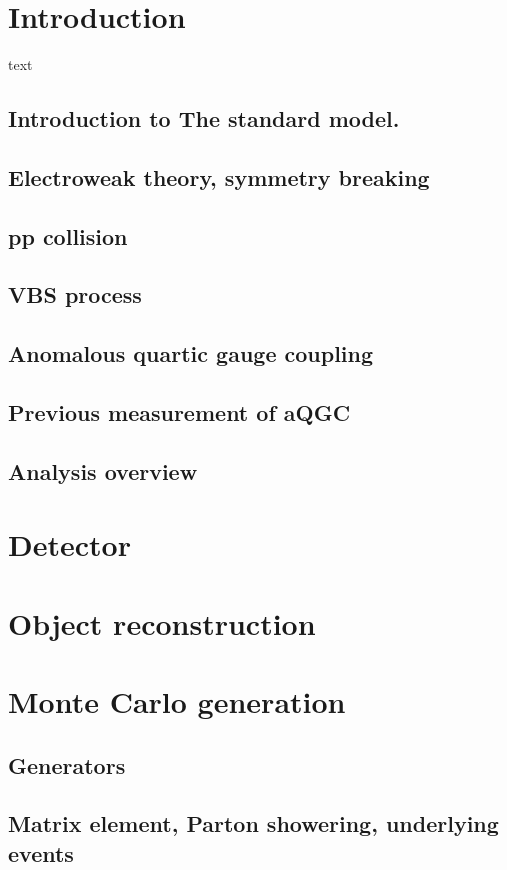 \documentclass[12pt]{article}
\begin{document}
\newpage 
\begin{doublespacing}
\section{Introduction}
text
\subsection{Introduction to The standard model.}
\subsection{Electroweak theory, symmetry breaking}
\subsection{pp collision}
\subsection{VBS process}
\subsection{Anomalous quartic gauge coupling}
\subsection{Previous measurement of aQGC}
\subsection{Analysis overview}
\section{Detector}
%
\section{Object reconstruction}



\section{Monte Carlo generation}
\subsection{Generators}
\subsection{Matrix element, Parton showering, underlying events}

\end{doublespacing}
\end{document}
